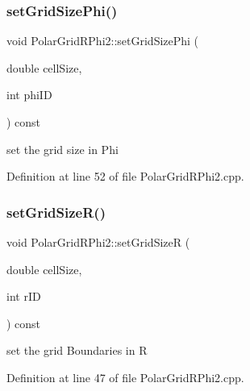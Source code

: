 \subsubsection{\texorpdfstring{set\+Grid\+Size\+Phi()}{setGridSizePhi()}}
{\footnotesize\ttfamily void Polar\+Grid\+R\+Phi2\+::set\+Grid\+Size\+Phi (\begin{DoxyParamCaption}\item[{double}]{cell\+Size,  }\item[{int}]{phi\+ID }\end{DoxyParamCaption}) const}



set the grid size in Phi 



Definition at line 52 of file Polar\+Grid\+R\+Phi2.\+cpp.

\hypertarget{class_d_d4hep_1_1_geometry_1_1_polar_grid_r_phi2_ac087d10bd2d8bae47635cce8d8412211}{}\label{class_d_d4hep_1_1_geometry_1_1_polar_grid_r_phi2_ac087d10bd2d8bae47635cce8d8412211} 
\subsubsection{\texorpdfstring{set\+Grid\+Size\+R()}{setGridSizeR()}}
{\footnotesize\ttfamily void Polar\+Grid\+R\+Phi2\+::set\+Grid\+SizeR (\begin{DoxyParamCaption}\item[{double}]{cell\+Size,  }\item[{int}]{r\+ID }\end{DoxyParamCaption}) const}



set the grid Boundaries in R 



Definition at line 47 of file Polar\+Grid\+R\+Phi2.\+cpp.

\hypertarget{class_d_d4hep_1_1_geometry_1_1_polar_grid_r_phi2_ac86b18cc3b90b64633ccd943dd2e0b6e}{}\label{class_d_d4hep_1_1_geometry_1_1_polar_grid_r_phi2_ac86b18cc3b90b64633ccd943dd2e0b6e} 
